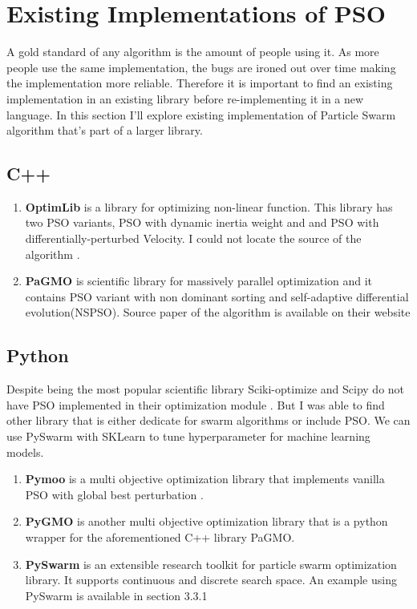 \documentclass{article}
\begin{document}
\section{Existing Implementations of PSO}
A gold standard of any algorithm is the amount of people using it. As more people use the same implementation, the bugs are ironed out over time making the implementation more reliable. Therefore it is important to find an existing implementation in an existing library before re-implementing it in a new language. In this section I'll explore existing implementation of Particle Swarm algorithm that's part of a larger library.

\subsection{C++}
\begin{enumerate}
    \item \textbf{OptimLib} is a library for optimizing non-linear function. This library has two PSO variants, PSO with dynamic inertia weight and and PSO with differentially-perturbed Velocity. I could not locate the source of the algorithm \cite{ohara}.
    \item \textbf{PaGMO} is scientific library for massively parallel optimization and it contains PSO variant with non dominant sorting and self-adaptive differential evolution(NSPSO). Source paper of the algorithm is available on their website\cite{Biscani2020}
\end{enumerate}

\subsection{Python}
Despite being the most popular scientific library Sciki-optimize and Scipy do not have PSO implemented in their optimization module \cite{scipy}. But I was able to find other library that is either dedicate for swarm algorithms or include PSO. We can use PySwarm with SKLearn to tune hyperparameter for machine learning models.

\begin{enumerate}
    \item \textbf{Pymoo} is a multi objective optimization library that implements vanilla PSO with global best perturbation \cite{pymoo}.
    \item \textbf{PyGMO} is another multi objective optimization library that is a python wrapper for the aforementioned C++ library PaGMO.
    \item \textbf{PySwarm} is an extensible research toolkit for particle swarm optimization library. It supports continuous and discrete search space. An example using PySwarm is available in section 3.3.1
\end{enumerate}
\end{document}
